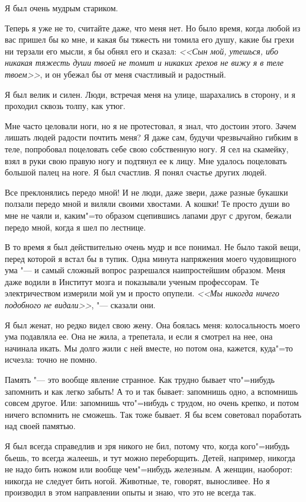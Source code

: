 Я был очень мудрым стариком.

Теперь я уже не то, считайте даже, что меня нет. Но было время, когда любой из вас пришел бы ко мне, и какая бы тяжесть ни томила его душу, какие бы грехи ни терзали его мысли, я бы обнял его и сказал: \textit{<<Сын мой, утешься, ибо никакая тяжесть души твоей не томит и никаких грехов не вижу я в теле твоем>>}, и он убежал бы от меня счастливый и радостный.

Я был велик и силен. Люди, встречая меня на улице, шарахались в сторону, и я проходил сквозь толпу, как утюг.

Мне часто целовали ноги, но я не протестовал, я знал, что достоин этого. Зачем лишать людей радости почтить меня? Я даже сам, будучи чрезвычайно гибким в теле, попробовал поцеловать себе свою собственную ногу. Я сел на скамейку, взял в руки свою правую ногу и подтянул ее к лицу. Мне удалось поцеловать большой палец на ноге. Я был счастлив. Я понял счастье других людей.

Все преклонялись передо мной! И не люди, даже звери, даже разные букашки ползали передо мной и виляли своими хвостами. А кошки! Те просто души во мне не чаяли и, каким"=то образом сцепившись лапами друг с другом, бежали передо мной, когда я шел по лестнице.

В то время я был действительно очень мудр и все понимал. Не было такой вещи, перед которой я встал бы в тупик. Одна минута напряжения моего чудовищного ума "--- и самый сложный вопрос разрешался наипростейшим образом. Меня даже водили в Институт мозга и показывали ученым профессорам. Те электричеством измерили мой ум и просто опупели. \textit{<<Мы никогда ничего подобного не видали>>}, "--- сказали они.

Я был женат, но редко видел свою жену. Она боялась меня: колосальность моего ума подавляла ее. Она не жила, а трепетала, и если я смотрел на нее, она начинала икать. Мы долго жили с ней вместе, но потом она, кажется, куда"=то исчезла: точно не помню.

Память "--- это вообще явление странное. Как трудно бывает что"=нибудь запомнить и как легко забыть! А то и так бывает: запомнишь одно, а вспомнишь совсем другое. Или: запомнишь что"=нибудь с трудом, но очень крепко, и потом ничего вспомнить не сможешь. Так тоже бывает. Я бы всем советовал поработать над своей памятью.

Я был всегда справедлив и зря никого не бил, потому что, когда кого"=нибудь бьешь, то всегда жалеешь, и тут можно переборщить. Детей, например, никогда не надо бить ножом или вообще чем"=нибудь железным. А женщин, наоборот: никогда не следует бить ногой. Животные, те, говорят, выносливее. Но я производил в этом направлении опыты и знаю, что это не всегда так.


